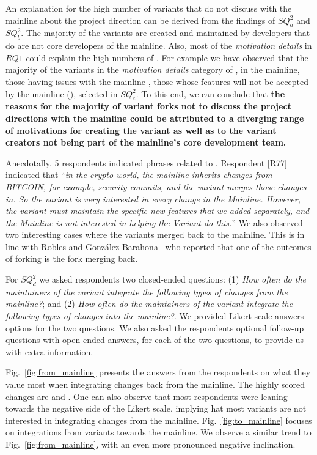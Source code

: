 An explanation for the high number of variants that do not discuss with the mainline about the project direction can be derived from the findings of $SQ^2_{a}$ and $SQ^2_{b}$. The majority of the variants are created and maintained by developers that do are not core developers of the mainline. Also, most of the \emph{motivation details} in $RQ1$ could explain the high numbers of . For example we have observed that the majority of the variants in the \emph{motivation details} category of ,  in the mainline, those having issues with the mainline , those whose features will not be accepted by the mainline (), selected   in $SQ^2_{c}$. To this end, we can conclude that \textbf{the reasons for the majority of variant forks not to discuss the project directions with the mainline could be attributed to a diverging range of motivations for creating the variant as well as to the variant creators not being part of the mainline's core development team.}

Anecdotally, 5 respondents indicated phrases related to .
Respondent [R77] indicated that ``\emph{in the crypto world, the mainline inherits changes from BITCOIN, for example, security commits, and the variant merges those changes in. So the variant is very interested in every change in the Mainline. However, the variant must maintain the specific new features that we added separately, and the Mainline is not interested in helping the Variant do this.}''
We also observed two interesting cases where the variants merged back to the mainline. This is in line with Robles and Gonz{\'a}lez-Barahona~\cite{Gregorio:2012} who reported that one of the outcomes of forking is the fork merging back.

For $SQ^2_{d}$ we asked respondents two closed-ended questions:
(1) \textit{How often do the maintainers of the variant integrate the following types of changes from the mainline?}; and (2) \textit{How often do the maintainers of the variant integrate the following types of changes into the mainline?}.
%
We provided Likert scale answers options for the two questions. We also asked the respondents optional follow-up questions with open-ended answers, for each of the two questions, to provide us with extra information.

Fig.~\ref{fig:from_mainline} presents the answers from the respondents on what they value most when integrating changes back from the mainline. The highly scored changes are  and .
One can also observe that most respondents were leaning towards the negative side of the Likert scale, implying hat most variants are not interested in integrating changes from the mainline.
Fig.~\ref{fig:to_mainline} focuses on integrations from variants towards the mainline. We observe a similar trend to Fig.~\ref{fig:from_mainline}, with an even more pronounced negative inclination.

